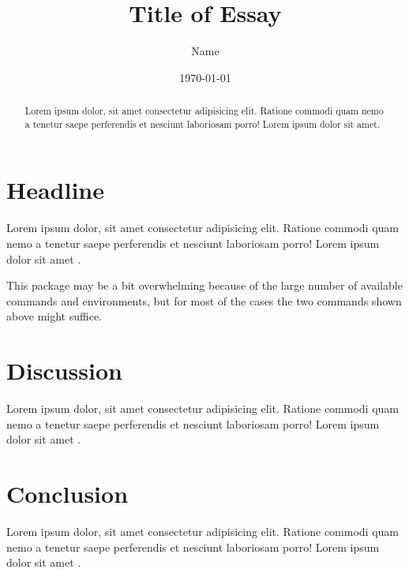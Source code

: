 \documentclass[a4paper]{article}
\title{Title of Essay}
\author{Name}
\date{\today}
\begin{document}
\maketitle

\begin{abstract}
Lorem ipsum dolor, sit amet consectetur adipisicing elit. Ratione commodi quam nemo a tenetur
saepe perferendis et nesciunt laboriosam porro! Lorem ipsum dolor sit amet.
\end{abstract}

\section{Headline}
Lorem ipsum dolor, sit amet consectetur adipisicing elit. Ratione commodi quam nemo a tenetur
saepe perferendis et nesciunt laboriosam porro! Lorem ipsum dolor sit amet \autocite[p. 101]{rainsford2014}.

\begin{displayquote}
    This package may be a bit overwhelming because of the large number of
    available commands and environments, but for most of the cases the
    two commands shown above might suffice. \autocite[p. 99]{wheeler2018}
\end{displayquote}

\section{Discussion}
Lorem ipsum dolor, sit amet consectetur adipisicing elit. Ratione commodi quam nemo a tenetur
saepe perferendis et nesciunt laboriosam porro! Lorem ipsum dolor sit amet \autocite{rainsford2014}.

\section{Conclusion}
Lorem ipsum dolor, sit amet consectetur adipisicing elit. Ratione commodi quam nemo a tenetur
saepe perferendis et nesciunt laboriosam porro! Lorem ipsum dolor sit amet \autocite{wheeler2018}.

\medskip
\printbibliography
\end{document}
